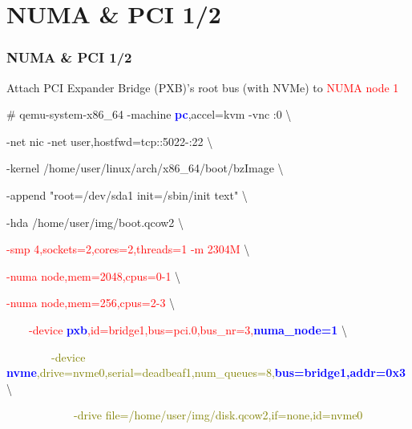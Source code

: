 \documentclass[aspectratio=169]{beamer}
\begin{document}

\section{NUMA \& PCI 1/2}
\begin{frame}
\frametitle{NUMA \& PCI 1/2}
{\large Attach PCI Expander Bridge (PXB)'s root bus (with NVMe) to \textcolor{red}{NUMA node 1}}
\begin{block}{}

\# qemu-system-x86\_64 -machine \textbf{\textcolor{blue}{pc}},accel=kvm -vnc :0 \textbackslash

-net nic -net user,hostfwd=tcp::5022-:22 \textbackslash

-kernel /home/user/linux/arch/x86\_64/boot/bzImage \textbackslash
	
-append "root=/dev/sda1 init=/sbin/init text" \textbackslash

-hda /home/user/img/boot.qcow2 \textbackslash

\textcolor{red}{-smp 4,sockets=2,cores=2,threads=1 -m 2304M} \textbackslash

\textcolor{red}{-numa node,mem=2048,cpus=0-1} \textbackslash

\textcolor{red}{-numa node,mem=256,cpus=2-3} \textbackslash

\textcolor{red}{\ \ \ \ -device \textbf{\textcolor{blue}{pxb}},id=bridge1,bus=pci.0,bus\_nr=3,\textbf{\textcolor{blue}{numa\_node=1}}} \textbackslash

\textcolor{olive}{\ \ \ \ \ \ \ \ -device \textbf{\textcolor{blue}{nvme}},drive=nvme0,serial=deadbeaf1,num\_queues=8,\textbf{\textcolor{blue}{bus=bridge1,addr=0x3}}} \textbackslash

\textcolor{olive}{\ \ \ \ \ \ \ \ \ \ \ \ -drive file=/home/user/img/disk.qcow2,if=none,id=nvme0}

\end{block}
\end{frame}

\end{document}
